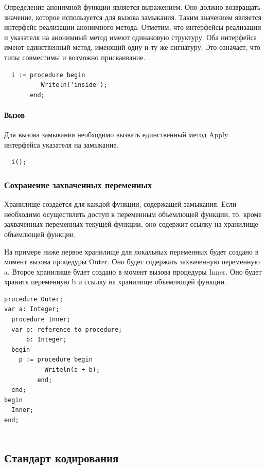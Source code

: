 \documentclass{imcs}
\begin{document}
Определение анонимной функции является выражением. Оно должно возвращать значение, которое
используется для вызова замыкания. Таким значением является интерфейс реализации анонимного
метода. Отметим, что интерфейсы реализации и указателя на анонимный метод имеют одинаковую
структуру. Оба интерфейса имеют единственный метод, имеющий одну и ту же сигнатуру. 
Это означает, что типы совместимы и возможно присваивание.

\begin{lstlisting}
  i := procedure begin
          Writeln('inside');
       end;
\end{lstlisting}

\paragraph{Вызов}

Для вызова замыкания необходимо вызвать единственный метод Apply интерфейса указателя на замыкание.

\begin{lstlisting}
  i();
\end{lstlisting}

\subsubsection{Сохранение захваченных переменных}

Хранилище создаётся для каждой функции, содержащей замыкания. Если необходимо
осуществлять доступ к переменным объемлющей функции, то, кроме захваченных
переменных текущей функции, оно содержит ссылку на хранилище объемлющей функции.

На примере ниже первое хранилище для локальных переменных будет создано в момент вызова процедуры
Outer. Оно будет содержать захваченную
переменную a. Второе хранилище будет создано в момент вызова процедуры Inner. Оно будет
хранить переменную b и ссылку на хранилище объемлющей функции.

\begin{lstlisting}
procedure Outer;
var a: Integer;
  procedure Inner;
  var p: reference to procedure;
      b: Integer;
  begin
    p := procedure begin
           Writeln(a + b);
         end;
  end;
begin
  Inner;
end;
  
\end{lstlisting}

\fi

\subsection{Стандарт кодирования}
\end{document}
